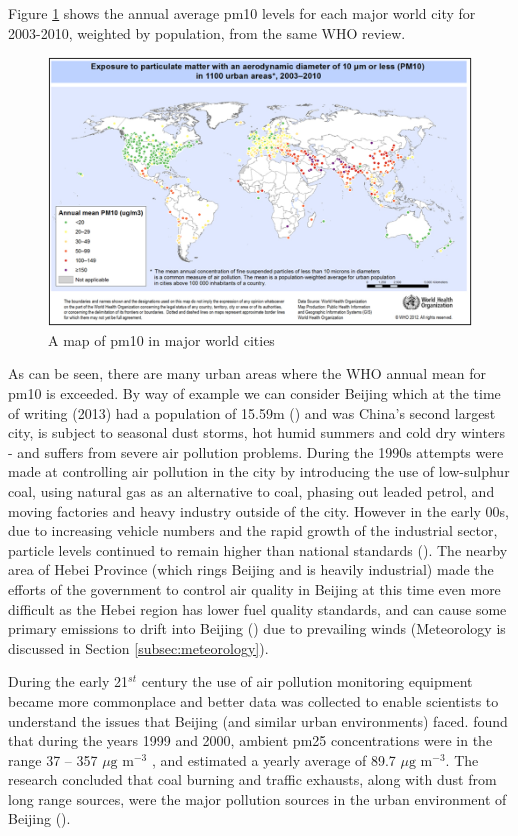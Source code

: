 Figure \ref{fig:mapofpm10} shows the annual average \gls{pm10} levels for each major world city for 2003-2010, weighted by population, from the same WHO review.

\begin{figure}[H]
\centering
\includegraphics[scale=0.8]{images/who_pm10_world_map}
\caption{A map of \gls{pm10} in major world cities}
\label{fig:mapofpm10}
\end{figure}

As can be seen, there are many urban areas where the WHO annual mean for \gls{pm10} is exceeded. By way of example we can consider Beijing which at the time of writing (2013) had a population of 15.59m (\cite{TheUnitedNationsStatisticsDivision2013}) and was China's second largest city, is subject to seasonal dust storms, hot humid summers and cold dry winters - and suffers from severe air pollution problems. During the 1990s attempts were made at controlling air pollution in the city by introducing the use of low-sulphur coal, using natural gas as an alternative to coal, phasing out leaded petrol, and moving factories and heavy industry outside of the city. However in the early 00s, due to increasing vehicle numbers and the rapid growth of the industrial sector, particle levels continued to remain higher than national standards (\cite{Sun2004}). The nearby area of Hebei Province (which rings Beijing and is heavily industrial) made the efforts of the government to control air quality in Beijing at this time even more difficult as the Hebei region has lower fuel quality standards, and can cause some primary emissions to drift into Beijing (\cite{Tuo2013}) due to prevailing winds (Meteorology is discussed in Section \ref{subsec:meteorology}).

During the early 21$^{st}$ century the use of air pollution monitoring equipment became more commonplace and better data was collected to enable scientists to understand the issues that Beijing (and similar urban environments) faced. \cite{Sun2004} found that during the years 1999 and 2000, ambient \gls{pm25} concentrations were in the range 37 -- 357 $\mu \text{g m}^{-3}$ , and estimated a yearly average of 89.7 $\mu \text{g m}^{-3}$.  The research concluded that coal burning and traffic exhausts, along with dust from long range sources, were the major pollution sources in the urban environment of Beijing (\cite{Sun2004}).

